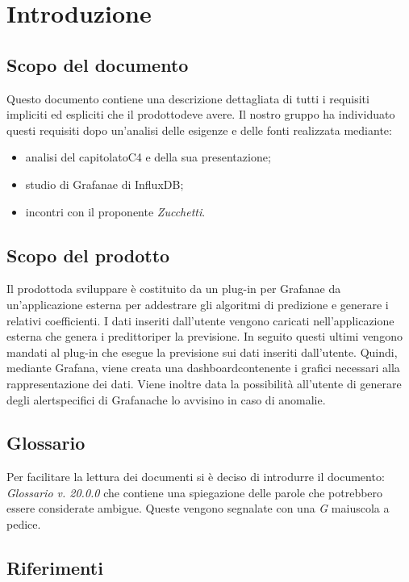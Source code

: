 \section{Introduzione}
	\subsection{Scopo del documento}
	Questo documento contiene una descrizione dettagliata di tutti i requisiti impliciti ed espliciti che il prodotto\glosp deve avere. Il nostro gruppo ha individuato questi requisiti dopo un'analisi delle esigenze e delle fonti realizzata mediante: 
	\begin{itemize}
		\item analisi del capitolato\glosp C4 e della sua presentazione; 
		\item studio di Grafana\glosp e di InfluxDB;
		\item incontri con il proponente \textit{Zucchetti}.
	\end{itemize}
	\subsection{Scopo del prodotto}
	Il prodotto\glosp da sviluppare è costituito da un plug-in per Grafana\glosp e da un'applicazione esterna per addestrare gli algoritmi di predizione e generare i relativi coefficienti. I dati inseriti dall'utente vengono caricati nell'applicazione esterna che genera i predittori\glosp per la previsione. In seguito questi ultimi vengono mandati al plug-in che esegue la previsione sui dati inseriti dall'utente. Quindi, mediante Grafana\glo, viene creata una dashboard\glosp contenente i grafici necessari alla rappresentazione dei dati. Viene inoltre data la possibilità all'utente di generare degli alert\glosp specifici di Grafana\glosp che lo avvisino in caso di anomalie.
		
	\subsection{Glossario}
	Per facilitare la lettura dei documenti si è deciso di introdurre il documento: \textit{Glossario v. 20.0.0} che contiene una spiegazione delle parole che potrebbero essere considerate ambigue. Queste vengono segnalate con una \textit{G} maiuscola a pedice.  
	\subsection{Riferimenti}

